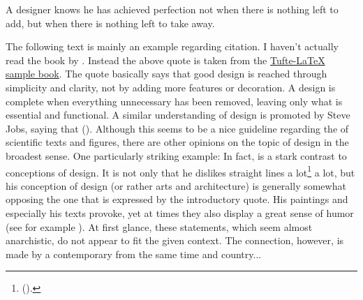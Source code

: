 \epigraph{A designer knows he has achieved perfection not when there is nothing left to add, but when there is nothing left to take away.}{}

The following text is mainly an example regarding citation. I haven’t actually read the book  by . Instead the above quote is taken from the \href{https://tug.ctan.org/macros/latex/contrib/tufte-latex/sample-book.pdf}{Tufte-LaTeX sample book}. The quote basically says that good design is reached through simplicity and clarity, not by adding more features or decoration. A design is complete when everything unnecessary has been removed, leaving only what is essential and functional. A similar understanding of design is promoted by Steve Jobs, saying that  (\cite{jobs2003design}). Although this seems to be a nice guideline regarding the  of scientific texts and figures, there are other opinions on the topic of design in the broadest sense. One particularly striking example:
In fact,  is a stark contrast to  conceptions of design. It is not only that he dislikes straight lines a lot\footnote{\Cf {} (\cite{hundertwasserweb1}).} a lot, but his conception of design (or rather arts and architecture) is generally somewhat opposing the one that is expressed by the introductory quote. His paintings and especially his texts provoke, yet at times they also display a great sense of humor (see for example \cite{hundertwasserweb3}). At first glance, these statements, which seem almost anarchistic, do not appear to fit the given context. The connection, however, is made by a contemporary from the same time and country...